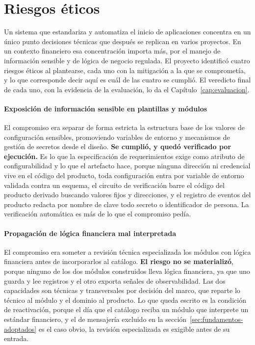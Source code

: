 
\section{Riesgos éticos}
\label{sec:riesgos-eticos}

Un sistema que estandariza y automatiza el inicio de aplicaciones concentra
en un único punto decisiones técnicas que después se replican en varios
proyectos. En un contexto financiero esa concentración importa más, por el
manejo de información sensible y de lógica de negocio regulada. El proyecto
identificó cuatro riesgos éticos al plantearse, cada uno con la mitigación a
la que se comprometía, y lo que corresponde decir aquí es cuál de las cuatro
se cumplió. El veredicto final de cada uno, con la evidencia de la
evaluación, lo da el Capítulo~\ref{cap:evaluacion}.

\paragraph*{Exposición de información sensible en plantillas y módulos}

El compromiso era separar de forma estricta la estructura base de los valores
de configuración sensibles, promoviendo variables de entorno y mecanismos de
gestión de secretos desde el diseño. \textbf{Se cumplió, y quedó verificado
por ejecución.} Es lo que la especificación de requerimientos exige como
atributo de configurabilidad y lo que el artefacto hace, porque ninguna
dirección ni credencial vive en el código del producto, toda
configuración entra por variable de entorno validada contra un esquema, el
circuito de verificación barre el código del producto derivado buscando
valores fijos y direcciones, y el registro de eventos del producto redacta
por nombre de clave todo secreto o identificador de persona. La verificación
automática es más de lo que el compromiso pedía.

\paragraph*{Propagación de lógica financiera mal interpretada}

El compromiso era someter a revisión técnica especializada los módulos con
lógica financiera antes de incorporarlos al catálogo. \textbf{El riesgo no se
materializó}, porque ninguno de los dos módulos construidos lleva lógica
financiera, ya que uno guarda y lee registros y el otro exporta señales de
observabilidad. Las dos capacidades son técnicas y transversales por decisión
del marco, que reparte lo técnico al módulo y el dominio al producto. Lo que
queda escrito es la condición de reactivación, porque el día que el catálogo
reciba un módulo que interprete un estándar financiero, y el de mensajería
excluido en la sección~\ref{sec:fundamentos-adoptados} es el caso obvio, la
revisión especializada es exigible antes de su entrada.

